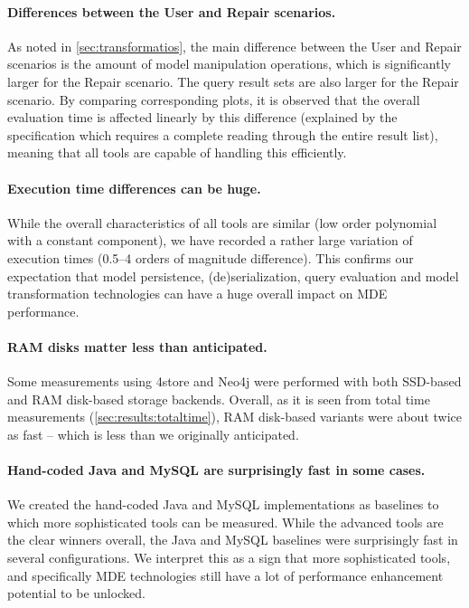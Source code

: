 \paragraph{Differences between the User and Repair scenarios.}
As noted in \autoref{sec:transformatios}, the main difference between the \textsf{User} and \textsf{Repair} scenarios is the amount of model manipulation operations, which is significantly larger for the \textsf{Repair} scenario. The query result sets are also larger for the \textsf{Repair} scenario. By comparing corresponding plots, it is observed that the overall evaluation time is affected linearly by this difference (explained by the specification which requires a complete reading through the entire result list), meaning that all tools are capable of handling this efficiently.

\paragraph{Execution time differences can be huge.}
While the overall characteristics of all tools are similar (low order polynomial with a constant component), we have recorded a rather large variation of execution times (0.5--4 orders of magnitude difference). This confirms our expectation that model persistence, (de)serialization, query evaluation and model transformation technologies can have a huge overall impact on MDE performance. 

\paragraph{RAM disks matter less than anticipated.}
Some measurements using 4store and Neo4j were performed with both SSD-based and RAM disk-based storage backends. Overall, as it is seen from total time measurements (\autoref{sec:results:totaltime}), RAM disk-based variants were about twice as fast -- which is less than we originally anticipated.

\paragraph{Hand-coded Java and MySQL are surprisingly fast in some cases.}
We created the hand-coded Java and MySQL implementations as baselines to which more sophisticated tools can be measured. While the advanced tools are the clear winners overall, the Java and MySQL baselines were surprisingly fast in several configurations. We interpret this as a sign that more sophisticated tools, and specifically MDE technologies still have a lot of performance enhancement potential to be unlocked.

